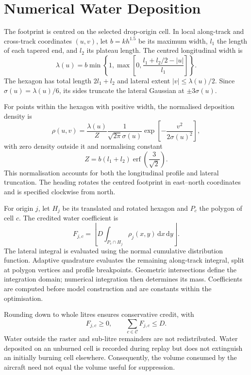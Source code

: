 \section{Numerical Water Deposition}
\label{sec:method-deposition}

The footprint is centred on the selected drop-origin cell. In local along-track and cross-track coordinates $(u,v)$, let $b=kh^{1.5}$ be its maximum width, $l_1$ the length of each tapered end, and $l_2$ its plateau length. The centred longitudinal width is
\begin{equation}
    \lambda(u)=b\min\!\left\{1,
        \max\!\left[0,\frac{l_1+l_2/2-|u|}{l_1}\right]\right\}.
\end{equation}
The hexagon has total length $2l_1+l_2$ and lateral extent $|v|\leq\lambda(u)/2$. Since $\sigma(u)=\lambda(u)/6$, its sides truncate the lateral Gaussian at $\pm3\sigma(u)$.

For points within the hexagon with positive width, the normalised deposition density is
\begin{equation}
    \rho(u,v)=\frac{\lambda(u)}{Z}
    \frac{1}{\sqrt{2\pi}\sigma(u)}
    \exp\!\left[-\frac{v^2}{2\sigma(u)^2}\right],
    \label{eq:static-density}
\end{equation}
with zero density outside it and normalising constant
\begin{equation}
    Z=b(l_1+l_2)\operatorname{erf}\!\left(\frac{3}{\sqrt{2}}\right).
\end{equation}
This normalisation accounts for both the longitudinal profile and lateral truncation. The heading rotates the centred footprint in east--north coordinates and is specified clockwise from north.

For origin $j$, let $H_j$ be its translated and rotated hexagon and $P_c$ the polygon of cell $c$. The credited water coefficient is
\begin{equation}
    F_{j,c}=\left\lfloor
        D\int_{P_c\cap H_j}\rho_j(x,y)\,\mathrm{d}x\,\mathrm{d}y
    \right\rfloor.
    \label{eq:static-deposition}
\end{equation}
The lateral integral is evaluated using the normal cumulative distribution function. Adaptive quadrature evaluates the remaining along-track integral, split at polygon vertices and profile breakpoints. Geometric intersections define the integration domain; numerical integration then determines its mass. Coefficients are computed before model construction and are constants within the optimisation.

Rounding down to whole litres ensures conservative credit, with
\begin{equation}
    F_{j,c}\geq0,
    \qquad\sum_{c\in\mathcal{C}}F_{j,c}\leq D.
\end{equation}
Water outside the raster and sub-litre remainders are not redistributed. Water deposited on an unburned cell is recorded during replay but does not extinguish an initially burning cell elsewhere. Consequently, the volume consumed by the aircraft need not equal the volume useful for suppression.

